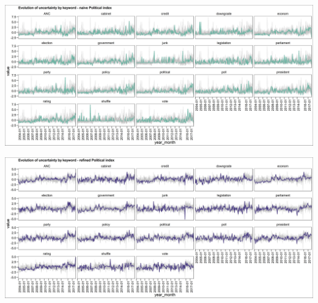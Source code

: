 \documentclass[11pt,preprint, authoryear]{elsarticle}
\let\origfigure\figure
\let\endorigfigure\endfigure
\renewenvironment{figure}[1][2] {
    \expandafter\origfigure\expandafter[H]
} {
    \endorigfigure
}
\numberwithin{equation}{section}
\numberwithin{figure}{section}
\numberwithin{table}{section}
\begin{document}
\begin{figure}
	\centering
	\includegraphics[width=\linewidth, keepaspectratio]{bin/pol_key_naive}\\
	
	\caption{Composite Political uncertainty naive index. \label{fig_pol_key_n}}
\end{figure}

\begin{figure}
	\centering
	\includegraphics[width=\linewidth, keepaspectratio]{bin/pol_key_refine}\\
	\caption{Composite Political uncertainty refined index. \label{fig_pol_key_r}}
\end{figure}
\end{document}
